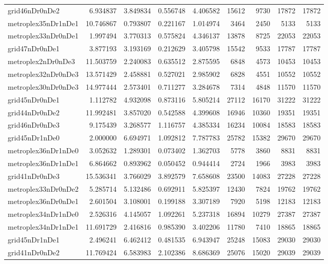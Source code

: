 \begin{longtable}{|l|r|r|r|r|r|r|r|r|}
grid46nDr0nDe2 & 6.934837 & 3.849834 & 0.556748 & 4.406582 & 15612 & 9730 & 17872 & 17872 \\
metroplex35nDr1nDe1 & 10.746867 & 0.793807 & 0.221167 & 1.014974 & 3464 & 2450 & 5133 & 5133 \\
metroplex33nDr0nDe1 & 1.997494 & 3.770313 & 0.575824 & 4.346137 & 13878 & 8725 & 22053 & 22053 \\
grid47nDr0nDe1 & 3.877193 & 3.193169 & 0.212629 & 3.405798 & 15542 & 9533 & 17787 & 17787 \\
metroplex2nDr0nDe3 & 11.503759 & 2.240083 & 0.635512 & 2.875595 & 6848 & 4573 & 10453 & 10453 \\
metroplex32nDr0nDe3 & 13.571429 & 2.458881 & 0.527021 & 2.985902 & 6828 & 4551 & 10552 & 10552 \\
metroplex30nDr0nDe3 & 14.977444 & 2.573401 & 0.711277 & 3.284678 & 7314 & 4848 & 11570 & 11570 \\
grid45nDr0nDe1 & 1.112782 & 4.932098 & 0.873116 & 5.805214 & 27112 & 16170 & 31222 & 31222 \\
grid44nDr0nDe2 & 11.992481 & 3.857020 & 0.542588 & 4.399608 & 16946 & 10360 & 19351 & 19351 \\
grid46nDr0nDe3 & 9.175439 & 3.268577 & 1.116757 & 4.385334 & 16234 & 10084 & 18583 & 18583 \\
grid45nDr1nDe0 & 2.000000 & 6.694971 & 1.092812 & 7.787783 & 25782 & 15382 & 29670 & 29670 \\
metroplex36nDr1nDe0 & 3.052632 & 1.289301 & 0.073402 & 1.362703 & 5778 & 3860 & 8831 & 8831 \\
metroplex36nDr1nDe1 & 6.864662 & 0.893962 & 0.050452 & 0.944414 & 2724 & 1966 & 3983 & 3983 \\
grid41nDr0nDe3 & 15.536341 & 3.766029 & 3.892579 & 7.658608 & 23500 & 14083 & 27228 & 27228 \\
metroplex33nDr0nDe2 & 5.285714 & 5.132486 & 0.692911 & 5.825397 & 12430 & 7824 & 19762 & 19762 \\
metroplex36nDr0nDe1 & 2.601504 & 3.108001 & 0.199188 & 3.307189 & 7920 & 5198 & 12183 & 12183 \\
metroplex34nDr1nDe0 & 2.526316 & 4.145057 & 1.092261 & 5.237318 & 16894 & 10279 & 27387 & 27387 \\
metroplex34nDr1nDe1 & 11.691729 & 2.416816 & 0.985390 & 3.402206 & 11780 & 7410 & 18865 & 18865 \\
grid45nDr1nDe1 & 2.496241 & 6.462412 & 0.481535 & 6.943947 & 25248 & 15083 & 29030 & 29030 \\
grid41nDr0nDe2 & 11.769424 & 6.583983 & 2.102386 & 8.686369 & 25076 & 15020 & 29039 & 29039 \\

\end{longtable}
